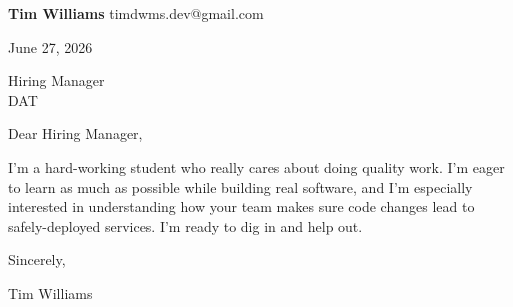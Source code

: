 \documentclass[12pt]{article}
\begin{document}
\textbf{Tim Williams} \hfill timdwms.dev@gmail.com

\vspace{1em}

June 27, 2026

\vspace{1em}

Hiring Manager \\
DAT

\vspace{1em}

Dear Hiring Manager,

I'm a hard-working student who really cares about doing quality work. I'm eager to learn as much as possible while building real software, and I'm especially interested in understanding how your team makes sure code changes lead to safely-deployed services. I'm ready to dig in and help out.

\vspace{1em}

Sincerely,

\vspace{2em}

Tim Williams
\end{document}
